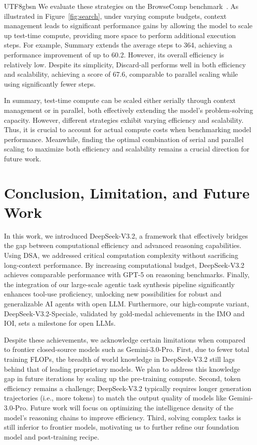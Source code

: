 \documentclass[11pt, a4paper, logo, copyright, nonumbering]{deepseek}
\def\newmodel{DeepSeek-V3.2}
\def\highmodel{DeepSeek-V3.2-Speciale}
\begin{document}
\begin{CJK*}{UTF8}{gbsn}
We evaluate these strategies on the BrowseComp benchmark~\citep{wei2025browsecomp}. 
As illustrated in Figure~\ref{fig:search}, under varying compute budgets, context management leads to significant performance gains by allowing the model to scale up test-time compute, providing more space to perform additional execution steps.
For example, Summary extends the average steps to 364, achieving a performance improvement of up to 60.2. However, its overall efficiency is relatively low.
Despite its simplicity, Discard-all performs well in both efficiency and scalability, achieving a score of 67.6, comparable to parallel scaling while using significantly fewer steps.

In summary, test-time compute can be scaled either serially through context management or in parallel, both effectively extending the model's problem-solving capacity.
However, different strategies exhibit varying efficiency and scalability. 
Thus, it is crucial to account for actual compute costs when benchmarking model performance. 
Meanwhile, finding the optimal combination of serial and parallel scaling to maximize both efficiency and scalability remains a crucial direction for future work.

\section{Conclusion, Limitation, and Future Work}
In this work, we introduced \newmodel, a framework that effectively bridges the gap between computational efficiency and advanced reasoning capabilities. Using DSA, we addressed critical computation complexity without sacrificing long-context performance. By increasing computational budget, \newmodel{} achieves comparable performance with GPT-5 on reasoning benchmarks. Finally, the integration of our large-scale agentic task synthesis pipeline significantly enhances tool-use proficiency, unlocking new possibilities for robust and generalizable AI agents with open LLM. Furthermore, our high-compute variant, \highmodel{}, validated by gold-medal achievements in the IMO and IOI, sets a milestone for open LLMs.

Despite these achievements, we acknowledge certain limitations when compared to frontier closed-source models such as Gemini-3.0-Pro. First, due to fewer total training FLOPs, the breadth of world knowledge in \newmodel{} still lags behind that of leading proprietary models. We plan to address this knowledge gap in future iterations by scaling up the pre-training compute. Second, token efficiency remains a challenge; \newmodel{} typically requires longer generation trajectories (i.e., more tokens) to match the output quality of models like Gemini-3.0-Pro. Future work will focus on optimizing the intelligence density of the model's reasoning chains to improve efficiency. Third, solving complex tasks is still inferior to frontier models, motivating us to further refine our foundation model and post-training recipe.




\end{CJK*}
\end{document}
